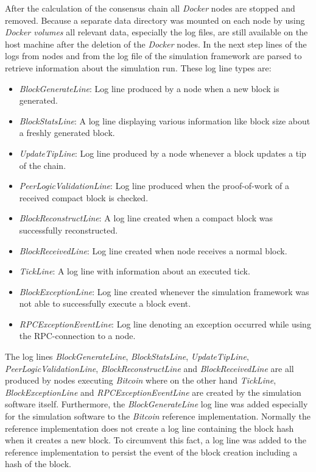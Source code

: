 After the calculation of the consensus chain all \textit{Docker} nodes are stopped and removed.
Because a separate data directory was mounted on each node by using \textit{Docker volumes} all relevant data, especially the log files, are still available on the host machine after the deletion of the \textit{Docker} nodes.
In the next step lines of the logs from nodes and from the log file of the simulation framework are parsed to retrieve information about the simulation run.
These log line types are:

\begin{itemize}
   \item \textit{BlockGenerateLine}: Log line produced by a node when a new block is generated.
   \item \textit{BlockStatsLine}: A log line displaying various information like block size about a freshly generated block.
   \item \textit{UpdateTipLine}: Log line produced by a node whenever a block updates a tip of the chain.
   \item \textit{PeerLogicValidationLine}: Log line produced when the proof-of-work of a received compact block is checked.  
   \item \textit{BlockReconstructLine}: A log line created when a compact block was successfully reconstructed.
   \item \textit{BlockReceivedLine}: Log line created when node receives a normal block.
   \item \textit{TickLine}: A log line with information about an executed tick.
   \item \textit{BlockExceptionLine}: Log line created whenever the simulation framework was not able to successfully execute a block event.
   \item \textit{RPCExceptionEventLine}: Log line denoting an exception occurred while using the RPC-connection to a node.
\end{itemize}

The log lines \textit{BlockGenerateLine}, \textit{BlockStatsLine}, \textit{UpdateTipLine}, \textit{PeerLogicValidationLine}, \textit{BlockReconstructLine} and \textit{BlockReceivedLine} are all produced by nodes executing \textit{Bitcoin} where on the other hand \textit{TickLine}, \textit{BlockExceptionLine} and \textit{RPCExceptionEventLine} are created by the simulation software itself.
Furthermore, the \textit{BlockGenerateLine} log line was added especially for the simulation software to the \textit{Bitcoin} reference implementation.
Normally the reference implementation does not create a log line containing the block hash when it creates a new block.
To circumvent this fact, a log line was added to the reference implementation to persist the event of the block creation including a hash of the block.

